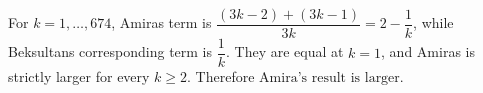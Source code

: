 For $k=1,\ldots,674$, Amira\textquotesingle s term is $\dfrac{(3k-2)+(3k-1)}{3k}=2-\dfrac{1}{k}$, while Beksultan\textquotesingle s corresponding term is $\dfrac{1}{k}$. They are equal at $k=1$, and Amira\textquotesingle s is strictly larger for every $k\ge2$. Therefore $\boxed{\text{Amira's result is larger}}$.
